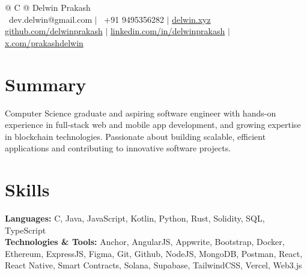 \documentclass[a4paper,10pt]{article}
\begin{document}
\pagestyle{empty} 

\begin{tabularx}{\linewidth}{@{} C @{}}
{\Huge Delwin Prakash} \\[6pt]

\textcolor{darkpurple}{\faEnvelope\ dev.delwin@gmail.com} $|$
\textcolor{darkpurple}{\faMobile\ +91 9495356282} $|$
\textcolor{darkpurple}{{\href{https://delwin.xyz}{\raisebox{-0.05\height}{\faGlobe} delwin.xyz}}} \\[4pt]

\textcolor{darkpurple}{\href{https://github.com/delwinprakash}{\raisebox{-0.05\height}{\faGithub} github.com/delwinprakash}} $|$
\textcolor{darkpurple}{\href{https://linkedin.com/in/delwinprakash}{\raisebox{-0.05\height}{\faLinkedin} linkedin.com/in/delwinprakash}} $|$
\textcolor{darkpurple}{\href{https://x.com/prakashdelwin}{\raisebox{-0.05\height}{\faTwitter} x.com/prakashdelwin}}
\end{tabularx}

\section{Summary}
\noindent Computer Science graduate and aspiring software engineer with hands-on experience in full-stack web and mobile app development, and growing expertise in blockchain technologies. Passionate about building scalable, efficient applications and contributing to innovative software projects.

\section{Skills}
\textbf{Languages:} C, Java, JavaScript, Kotlin, Python, Rust, Solidity, SQL, TypeScript\\[4pt]
\textbf{Technologies \& Tools:} Anchor, AngularJS, Appwrite, Bootstrap, Docker, Ethereum, ExpressJS, Figma, Git, Github, NodeJS, MongoDB, Postman, React, React Native, Smart Contracts, Solana, Supabase, TailwindCSS, Vercel, Web3.js

\end{document}
